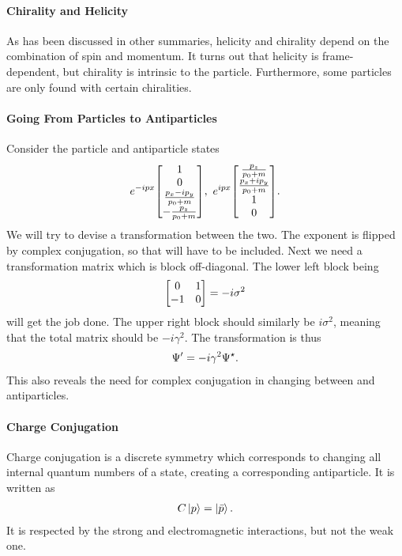 \paragraph{Chirality and Helicity}
As has been discussed in other summaries, helicity and chirality depend on the combination of spin and momentum. It turns out that helicity is frame-dependent, but chirality is intrinsic to the particle. Furthermore, some particles are only found with certain chiralities.

\paragraph{Going From Particles to Antiparticles}
Consider the particle and antiparticle states
\begin{align*}
	e^{-ipx}\mqty[
		1 \\
		0 \\
		\frac{p_{x} - ip_{y}}{p_{0} + m} \\
		-\frac{p_{	z}}{p_{0} + m}
	],\ e^{ipx}\mqty[
		\frac{p_{z}}{p_{0} + m} \\
		\frac{p_{x} + ip_{y}}{p_{0} + m} \\
		1 \\
		0
	].
\end{align*}
We will try to devise a transformation between the two. The exponent is flipped by complex conjugation, so that will have to be included. Next we need a transformation matrix which is block off-diagonal. The lower left block being
\begin{align*}
	\mqty[
		0  & 1 \\
		-1 & 0
	] = -i\sigma^{2}
\end{align*}
will get the job done. The upper right block should similarly be $i\sigma^{2}$, meaning that the total matrix should be $-i\gamma^{2}$. The transformation is thus
\begin{align*}
	\Psi^{\prime} = -i\gamma^{2}\Psi^{\star}.
\end{align*}
This also reveals the need for complex conjugation in changing between and antiparticles.

\paragraph{Charge Conjugation}
Charge conjugation is a discrete symmetry which corresponds to changing all internal quantum numbers of a state, creating a corresponding antiparticle. It is written as
\begin{align*}
	C\ket{p} = \ket{\bar{p}}.
\end{align*}
It is respected by the strong and electromagnetic interactions, but not the weak one.

